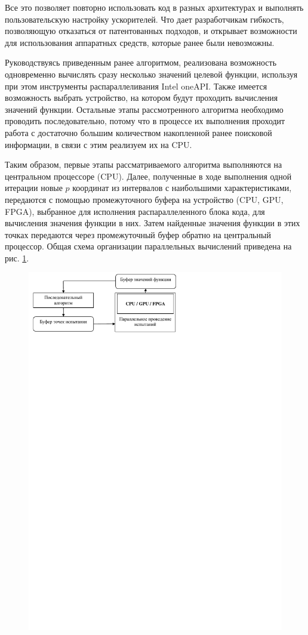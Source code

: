 \documentclass[10pt,a4paper]{book}
\begin{document}
Все это позволяет повторно использовать код в разных архитектурах и выполнять пользовательскую настройку ускорителей. Что дает разработчикам гибкость, позволяющую отказаться от патентованных подходов, и открывает возможности для использования аппаратных средств, которые ранее были невозможны.

Руководствуясь приведенным ранее алгоритмом, реализована возможность одновременно вычислять сразу несколько значений целевой функции, используя при этом инструменты распараллеливания Intel oneAPI. Также имеется возможность выбрать устройство, на котором будут проходить вычисления значений функции. Остальные этапы рассмотренного алгоритма необходимо проводить последовательно, потому что в процессе их выполнения проходит работа с достаточно большим количеством накопленной ранее поисковой информации, в связи с этим реализуем их на CPU. 

Таким образом, первые этапы рассматриваемого алгоритма выполняются на центральном процессоре (CPU). Далее, полученные в ходе выполнения одной итерации новые $p$ координат из интервалов с наибольшими характеристиками, передаются с помощью промежуточного буфера на устройство (CPU, GPU, FPGA), выбранное для исполнения распараллеленного блока кода, для вычисления значения функции в них. Затем найденные значения функции в этих точках передаются через промежуточный буфер обратно на центральный процессор. Общая схема организации параллельных вычислений приведена на рис. \ref{fig:s1}.


\begin{figure}
\begin{center}
  \includegraphics[width=0.7\linewidth]{./pic/s1.pdf}
  \label{fig:s1}  
\end{center}
\end{figure}
\end{document}
